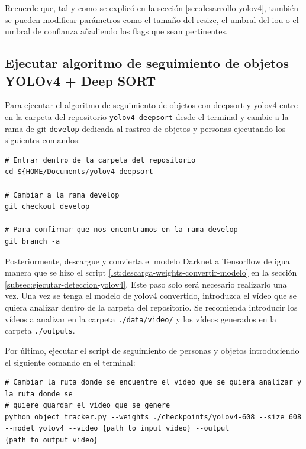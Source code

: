 Recuerde que, tal y como se explicó en la sección \ref{sec:desarrollo-yolov4}, también se pueden modificar parámetros como el tamaño del resize, el umbral del \gls{iou} o el umbral de confianza añadiendo los flags que sean pertinentes.

\subsection{Ejecutar algoritmo de seguimiento de objetos YOLOv4 + Deep SORT}
\label{subsec:ejecutar-seguimiento-yolov4-deepsort}

Para ejecutar el algoritmo de seguimiento de objetos con \gls{deepsort} y \gls{yolov4} entre en la carpeta del repositorio \texttt{yolov4-deepsort} desde el terminal y cambie a la rama de git \texttt{develop} dedicada al rastreo de objetos y personas ejecutando los siguientes comandos:

\vspace{0.5cm}
\begin{lstlisting}[language=iPython,caption=cambiar a la rama develop,captionpos=b,label={lst:git-checkout-develop}]
# Entrar dentro de la carpeta del repositorio
cd ${HOME/Documents/yolov4-deepsort

# Cambiar a la rama develop 
git checkout develop

# Para confirmar que nos encontramos en la rama develop
git branch -a
\end{lstlisting}

Posteriormente, descargue y convierta el modelo Darknet a Tensorflow de igual manera que se hizo el script \ref{lst:descarga-weights-convertir-modelo} en la sección \ref{subsec:ejecutar-deteccion-yolov4}. Este paso solo será necesario realizarlo una vez. Una vez se tenga el modelo de \gls{yolov4} convertido, introduzca el vídeo que se quiera analizar dentro de la carpeta del repositorio. Se recomienda introducir los vídeos a analizar en la carpeta \texttt{./data/video/} y los vídeos generados en la carpeta \texttt{./outputs}.

Por último, ejecutar el script de seguimiento de personas y objetos introduciendo el siguiente comando en el terminal:

\vspace{0.5cm}
\begin{lstlisting}[language=iPython,caption=Ejecutar script seguimiento de personas y objetos con DeepSORT,captionpos=b,label={lst:ejecutar-yolov4-deepsort}]
# Cambiar la ruta donde se encuentre el video que se quiera analizar y la ruta donde se
# quiere guardar el video que se genere
python object_tracker.py --weights ./checkpoints/yolov4-608 --size 608 --model yolov4 --video {path_to_input_video} --output {path_to_output_video}
\end{lstlisting}


